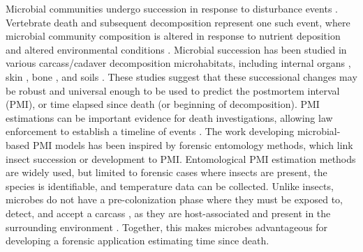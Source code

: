 \documentclass[
  10pt,
  letterpaper,
]{article}
\begin{document}
Microbial communities undergo succession in response to disturbance
events \citep{shade_fundamentals_2012}. Vertebrate death and subsequent
decomposition represent one such event, where microbial community
composition is altered in response to nutrient deposition and altered
environmental conditions
\citep{howard_characterization_2010, pechal_potential_2014, metcalf_microbial_2013, cobaugh_functional_2015, javan_human_2016, mason_microbial_2023}.
Microbial succession has been studied in various carcass/cadaver
decomposition microhabitats, including internal organs
\citep{javan_thanatomicrobiome_2016, bell_sex-related_2018, can_distinctive_2014, lutz_effects_2020, li_potential_2021, hauther_estimating_2015, dong_succession_2019},
skin
\citep{pechal_potential_2014, metcalf_microbial_2013, hyde_initial_2015, pechal_large-scale_2018, johnson_machine_2016, metcalf_microbial_2016},
bone \citep{damann_potential_2015, emmons_postmortem_2022}, and soils
\citep{metcalf_microbial_2013, cobaugh_functional_2015, metcalf_microbial_2016, singh_temporal_2018, mason_body_2022}.
These studies suggest that these successional changes may be robust and
universal enough to be used to predict the postmortem interval (PMI), or
time elapsed since death (or beginning of decomposition). PMI
estimations can be important evidence for death investigations, allowing
law enforcement to establish a timeline of events
\citep{moffatt_improved_2016}. The work developing microbial-based PMI
models has been inspired by forensic entomology methods, which link
insect succession or development to PMI. Entomological PMI estimation
methods are widely used, but limited to forensic cases where insects are
present, the species is identifiable, and temperature data can be
collected. Unlike insects, microbes do not have a pre-colonization phase
where they must be exposed to, detect, and accept a carcass
\citep{tarone_is_2017, tomberlin_roadmap_2011}, as they are
host-associated and present in the surrounding environment
\citep{mason_microbial_2023}. Together, this makes microbes advantageous
for developing a forensic application estimating time since death.
\end{document}
